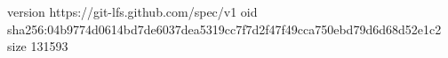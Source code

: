version https://git-lfs.github.com/spec/v1
oid sha256:04b9774d0614bd7de6037dea5319cc7f7d2f47f49cca750ebd79d6d68d52e1c2
size 131593
